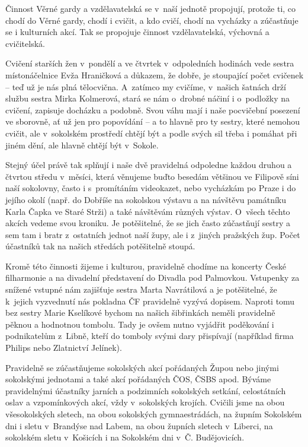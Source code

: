 \documentclass[a5paper, 11pt, twoside]{article}
\begin{document}
Činnost Věrné gardy a vzdělavatelská se v~naší jednotě propojují,
protože ti, co chodí do Věrné gardy, chodí i cvičit, a kdo cvičí, chodí
na vycházky a zúčastňuje se i kulturních akcí. Tak se propojuje činnost
vzdělavatelská, výchovná a cvičitelská.

Cvičení starších žen v~pondělí a ve čtvrtek v~odpoledních hodinách vede
sestra místonáčelnice Evža Hraničková a důkazem, že dobře, je stoupající
počet cvičenek -- teď už je nás plná tělocvična. A~zatímco my cvičíme,
v~našich šatnách drží službu sestra Mirka Kolmerová, stará se nám o~drobné
náčiní i o~podložky na cvičení, zapisuje docházku a podobně. Svou váhu
mají i naše pocvičební posezení ve sborovně, ať už jen pro popovídání --
a to hlavně pro ty sestry, které nemohou cvičit, ale v~sokolském
prostředí chtějí být a podle svých sil třeba i pomáhat při jiném dění,
ale hlavně chtějí být v~Sokole.

Stejný účel právě tak splňují i naše dvě pravidelná odpoledne každou
druhou a čtvrtou středu v~měsíci, která věnujeme buďto besedám většinou
ve Filipově síni naší sokolovny, často i s~promítáním videokazet, nebo
vycházkám po Praze i do jejího okolí (např. do Dobříše na sokolskou
výstavu a na návštěvu památníku Karla Čapka ve Staré Strži) a také
návštěvám různých výstav. O~všech těchto akcích vedeme svou kroniku. Je
potěšitelné, že se jich často zúčastňují sestry a sem tam i bratr
z~ostatních jednot naší župy, ale i z~jiných pražských žup. Počet
účastníků tak na našich středách potěšitelně stoupá.

{\sloppy Kromě této činnosti žijeme i kulturou, pravidelně chodíme na koncerty
České filharmonie a na divadelní představení do Divadla pod Palmovkou.
Vstupenky za snížené vstupné nám zajišťuje sestra Marta Navrátilová a je
potěšitelné, že k~jejich vyzvednutí nás pokladna ČF pravidelně vyzývá
dopisem. Naproti tomu bez sestry Marie Kselíkové bychom na našich
šibřinkách neměli pravidelně pěknou a hodnotnou tombolu. Tady je ovšem
nutno vyjádřit poděkování i podnikatelům z~Libně, kteří do tomboly svými
dary přispívají (například firma Philips nebo Zlatnictví Jelínek).\par}

Pravidelně se zúčastňujeme sokolských akcí pořádaných Župou nebo jinými
sokolskými jednotami a také akcí pořádaných ČOS, ČSBS apod. Býváme
pravidelnými účastníky jarních a podzimních sokolských setkání,
celostátních oslav a vzpomínkových akcí, vždy v~sokolských krojích.
Cvičili jsme na obou všesokolských sletech, na obou sokolských
gymnaestrádách, na župním Sokolském dni i sletu v~Brandýse nad Labem, na
obou župních sletech v~Liberci, na sokolském sletu v~Košicích i na
Sokolském dni v~Č. Budějovicích.
\end{document}
